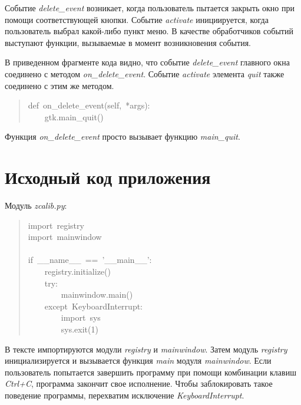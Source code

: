 \documentclass[14pt,a4paper,openany,twoside,final]{extbook}
\providecommand*{\DUroletitlereference}[1]{\textsl{#1}}
\begin{document}
Событие \DUroletitlereference{delete\_event} возникает, когда пользователь пытается закрыть
окно при помощи соответствующей кнопки.  Событие \DUroletitlereference{activate}
инициируется, когда пользователь выбрал какой-либо пункт меню.  В
качестве обработчиков событий выступают функции, вызываемые в момент
возникновения события.

В приведенном фрагменте кода видно, что событие \DUroletitlereference{delete\_event}
главного окна соединено с методом \DUroletitlereference{on\_delete\_event}.  Событие
\DUroletitlereference{activate} элемента \DUroletitlereference{quit} также соединено с этим же методом.

\begin{quote}{\ttfamily \raggedright \noindent
def~on\_delete\_event(self,~*args):\\
~~~~gtk.main\_quit()
}
\end{quote}

Функция \DUroletitlereference{on\_delete\_event} просто вызывает функцию \DUroletitlereference{main\_quit}.


\section{Исходный код приложения%
  \label{id52}%
}

Модуль \DUroletitlereference{zcalib.py}:

\begin{quote}{\ttfamily \raggedright \noindent
import~registry\\
import~mainwindow\\
~\\
if~\_\_name\_\_~==~'\_\_main\_\_':\\
~~~~registry.initialize()\\
~~~~try:\\
~~~~~~~~mainwindow.main()\\
~~~~except~KeyboardInterrupt:\\
~~~~~~~~import~sys\\
~~~~~~~~sys.exit(1)
}
\end{quote}

В тексте импортируются модули \DUroletitlereference{registry} и \DUroletitlereference{mainwindow}.  Затем модуль
\DUroletitlereference{registry} инициализируется и вызывается функция \DUroletitlereference{main} модуля
\DUroletitlereference{mainwindow}.  Если пользователь попытается завершить программу при
помощи комбинации клавиш \DUroletitlereference{Ctrl+C}, программа закончит свое исполнение.
Чтобы заблокировать такое поведение программы, перехватим исключение
\DUroletitlereference{KeyboardInterrupt}.
\end{document}
